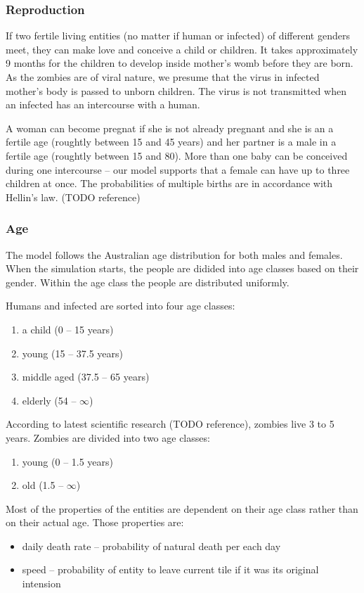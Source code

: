 \documentclass[a4paper]{article}
\begin{document}
\subsubsection{Reproduction}

If two fertile living entities (no matter if human or infected) of different genders meet, they can make love and conceive a child or children.
It takes approximately 9 months for the children to develop inside mother's womb before they are born.
As the zombies are of viral nature, we presume that the virus in infected mother's body is passed to unborn children.
The virus is not transmitted when an infected has an intercourse with a human.

A woman can become pregnat if she is not already pregnant and she is an a fertile age (roughtly between 15 and 45 years) and her partner is a male in a fertile age (roughtly between 15 and 80).
More than one baby can be conceived during one intercourse -- our model supports that a female can have up to three children at once.
The probabilities of multiple births are in accordance with Hellin's law. (TODO reference)

\subsubsection{Age}

The model follows the Australian age distribution for both males and females.
When the simulation starts, the people are didided into age classes based on their gender.
Within the age class the people are distributed uniformly.

Humans and infected are sorted into four age classes:
\begin{enumerate}
\item a child (0 -- 15 years)
\item young (15 -- 37.5 years)
\item middle aged (37.5 -- 65 years)
\item elderly (54 -- $\infty$)
\end{enumerate}

According to latest scientific research (TODO reference), zombies live 3 to 5 years. 
Zombies are divided into two age classes:
\begin{enumerate}
\item young (0 -- 1.5 years)
\item old (1.5 -- $\infty$)
\end{enumerate}

Most of the properties of the entities are dependent on their age class rather than on their actual age.
Those properties are:
\begin{itemize}
\item daily death rate -- probability of natural death per each day
\item speed -- probability of entity to leave current tile if it was its original intension
\end{itemize}
\end{document}
